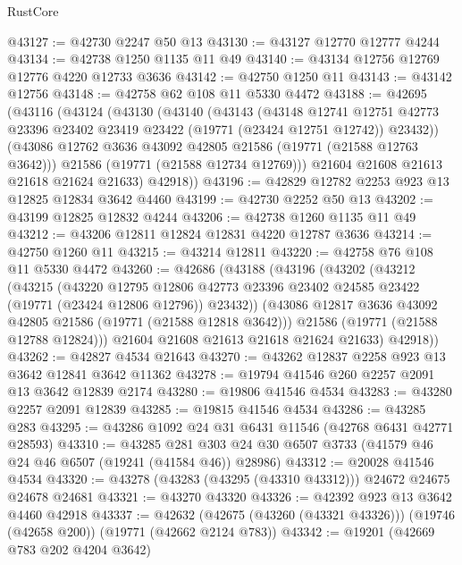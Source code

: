 \begin{lexlean}{RustCore}
\begin{coremodule}
@43127 := @42730 @2247 @50 @13
@43130 := @43127 @12770 @12777 @4244
@43134 := @42738 @1250 @1135 @11 @49
@43140 := @43134 @12756 @12769 @12776 @4220 @12733 @3636
@43142 := @42750 @1250 @11
@43143 := @43142 @12756
@43148 := @42758 @62 @108 @11 @5330 @4472
@43188 := @42695
    (@43116
      (@43124
        (@43130
          (@43140
            (@43143
              (@43148
                @12741
                @12751
                @42773
                @23396
                @23402
                @23419
                @23422
                (@19771 (@23424 @12751 @12742))
                @23432))
            (@43086 @12762 @3636 @43092 @42805 @21586 (@19771 (@21588 @12763 @3642)))
            @21586
            (@19771 (@21588 @12734 @12769)))
          @21604
          @21608
          @21613
          @21618
          @21624
          @21633)
        @42918))
@43196 := @42829 @12782 @2253 @923 @13 @12825 @12834 @3642 @4460
@43199 := @42730 @2252 @50 @13
@43202 := @43199 @12825 @12832 @4244
@43206 := @42738 @1260 @1135 @11 @49
@43212 := @43206 @12811 @12824 @12831 @4220 @12787 @3636
@43214 := @42750 @1260 @11
@43215 := @43214 @12811
@43220 := @42758 @76 @108 @11 @5330 @4472
@43260 := @42686
    (@43188
      (@43196
        (@43202
          (@43212
            (@43215
              (@43220
                @12795
                @12806
                @42773
                @23396
                @23402
                @24585
                @23422
                (@19771 (@23424 @12806 @12796))
                @23432))
            (@43086 @12817 @3636 @43092 @42805 @21586 (@19771 (@21588 @12818 @3642)))
            @21586
            (@19771 (@21588 @12788 @12824)))
          @21604
          @21608
          @21613
          @21618
          @21624
          @21633)
        @42918))
@43262 := @42827 @4534 @21643
@43270 := @43262 @12837 @2258 @923 @13 @3642 @12841 @3642 @11362
@43278 := @19794 @41546 @260 @2257 @2091 @13 @3642 @12839 @2174
@43280 := @19806 @41546 @4534
@43283 := @43280 @2257 @2091 @12839
@43285 := @19815 @41546 @4534
@43286 := @43285 @283
@43295 := @43286 @1092 @24 @31 @6431 @11546 (@42768 @6431 @42771 @28593)
@43310 := @43285
    @281
    @303
    @24
    @30
    @6507
    @3733
    (@41579 @46 @24 @46 @6507 (@19241 (@41584 @46)) @28986)
@43312 := @20028 @41546 @4534
@43320 := @43278 (@43283 (@43295 (@43310 @43312))) @24672 @24675 @24678 @24681
@43321 := @43270 @43320
@43326 := @42392 @923 @13 @3642 @4460 @42918
@43337 := @42632
    (@42675 (@43260 (@43321 @43326)))
    (@19746 (@42658 @200))
    (@19771 (@42662 @2124 @783))
@43342 := @19201 (@42669 @783 @202 @4204 @3642)

\end{coremodule}
\end{lexlean}
